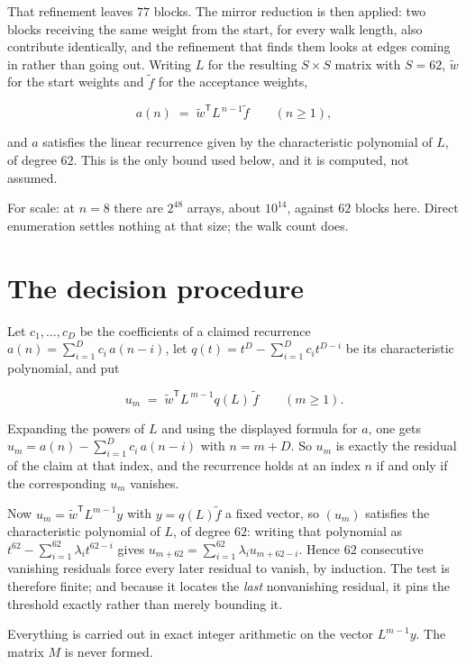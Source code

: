 \documentclass[11pt]{article}
\theoremstyle{definition}
\begin{document}
That refinement leaves $77$ blocks. The mirror reduction is then applied: two blocks receiving the same weight from the start, for every walk length, also contribute identically, and the refinement that finds them looks at edges coming in rather than going out. Writing $L$ for the resulting $S \times S$ matrix with $S = 62$, $\tilde w$ for the start weights and $\tilde f$ for the acceptance weights,

\[a(n) \;=\; \tilde w^{\mathsf T} L^{\,n-1} \tilde f \qquad (n \ge 1),\]

and $a$ satisfies the linear recurrence given by the characteristic polynomial of $L$, of degree $62$. This is the only bound used below, and it is computed, not assumed.

For scale: at $n = 8$ there are $2^{48}$ arrays, about $10^{14}$, against $62$ blocks here. Direct enumeration settles nothing at that size; the walk count does.

\section{The decision procedure}

Let $c_1,\dots,c_D$ be the coefficients of a claimed recurrence $a(n) = \sum_{i=1}^{D} c_i\,a(n-i)$, let $q(t) = t^{D} - \sum_{i=1}^{D} c_i t^{D-i}$ be its characteristic polynomial, and put

\[u_m \;=\; \tilde w^{\mathsf T} L^{\,m-1} q(L)\,\tilde f \qquad (m \ge 1).\]

Expanding the powers of $L$ and using the displayed formula for $a$, one gets $u_m = a(n) - \sum_{i=1}^{D} c_i\,a(n-i)$ with $n = m + D$. So $u_m$ is exactly the residual of the claim at that index, and the recurrence holds at an index $n$ if and only if the corresponding $u_m$ vanishes.

Now $u_m = \tilde w^{\mathsf T} L^{m-1} y$ with $y = q(L)\tilde f$ a fixed vector, so $(u_m)$ satisfies the characteristic polynomial of $L$, of degree $62$: writing that polynomial as $t^{62} - \sum_{i=1}^{62} \lambda_i t^{62-i}$ gives $u_{m+62} = \sum_{i=1}^{62} \lambda_i u_{m+62-i}$. Hence $62$ consecutive vanishing residuals force every later residual to vanish, by induction. The test is therefore finite; and because it locates the {\itshape last} nonvanishing residual, it pins the threshold exactly rather than merely bounding it.

Everything is carried out in exact integer arithmetic on the vector $L^{m-1}y$. The matrix $M$ is never formed.
\end{document}
